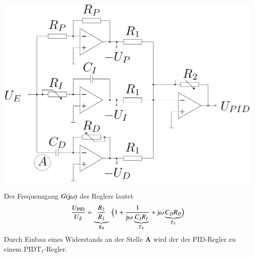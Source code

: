 \begin{minipage}[c]{0.45\columnwidth}
    \includegraphics[width=\columnwidth]{images/realisierung_pid-regler_variante_2.png}
\end{minipage}
\hfill
\begin{minipage}[c]{0.52\columnwidth}
    Der Frequenzgang $G(\mathrm{j} \omega)$ des Reglers lautet
    $$ \frac{U_{\rm PID}}{U_E} = \underbrace{ \frac{R_2}{R_1} }_{K_R} \cdot \Bigl( 1 + \frac{1}{\mathrm{j} \omega \underbrace{C_I R_I}_{T_N}} 
        + \mathrm{j} \omega \underbrace{ C_D R_D }_{T_V} \Bigr) $$
    Durch Einbau eines Widerstands an der Stelle \textbf{A} wird der der PID-Regler zu einem $\text{PIDT}_1$-Regler.
\end{minipage}